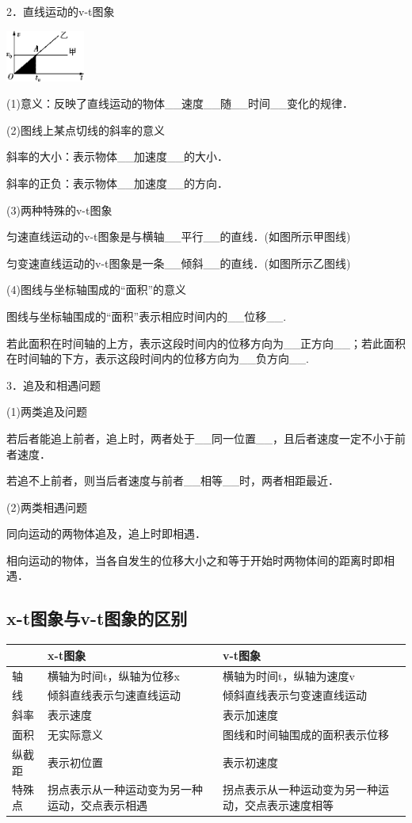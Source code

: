 \documentclass[cn,10.5pt,chinese,mac,chinesefont=founder]{elegantbook}
\begin{document}
2．直线运动的v-t图象

\begin{center}\includegraphics[width=1.02083in,height=0.66667in]{media/image30.png}\end{center}
	

(1)意义：反映了直线运动的物体\_\_速度\_\_随\_\_时间\_\_变化的规律．

(2)图线上某点切线的斜率的意义

斜率的大小：表示物体\_\_加速度\_\_的大小．

斜率的正负：表示物体\_\_加速度\_\_的方向．

(3)两种特殊的v-t图象

匀速直线运动的v-t图象是与横轴\_\_平行\_\_的直线．(如图所示甲图线)

匀变速直线运动的v-t图象是一条\_\_倾斜\_\_的直线．(如图所示乙图线)

(4)图线与坐标轴围成的``面积''的意义

图线与坐标轴围成的``面积''表示相应时间内的\_\_位移\_\_.

若此面积在时间轴的上方，表示这段时间内的位移方向为\_\_正方向\_\_；若此面积在时间轴的下方，表示这段时间内的位移方向为\_\_负方向\_\_.

3．追及和相遇问题

(1)两类追及问题

若后者能追上前者，追上时，两者处于\_\_同一位置\_\_，且后者速度一定不小于前者速度．

若追不上前者，则当后者速度与前者\_\_相等\_\_时，两者相距最近．

(2)两类相遇问题

同向运动的两物体追及，追上时即相遇．

相向运动的物体，当各自发生的位移大小之和等于开始时两物体间的距离时即相遇．

\newpage
\subsection{x-t图象与v-t图象的区别}

\begin{longtable}[]{@{}m{1.5cm}m{6cm}m{6cm}@{}}
\toprule
& x-t图象 & v-t图象\tabularnewline
\midrule
\endhead
轴 & 横轴为时间t，纵轴为位移x & 横轴为时间t，纵轴为速度v\tabularnewline
线 & 倾斜直线表示匀速直线运动 &
倾斜直线表示匀变速直线运动\tabularnewline
斜率 & 表示速度 & 表示加速度\tabularnewline
面积 & 无实际意义 & 图线和时间轴围成的面积表示位移\tabularnewline
纵截距 & 表示初位置 & 表示初速度\tabularnewline
特殊点 & 拐点表示从一种运动变为另一种运动，交点表示相遇 &
拐点表示从一种运动变为另一种运动，交点表示速度相等\tabularnewline
\bottomrule
\end{longtable}
\end{document}
